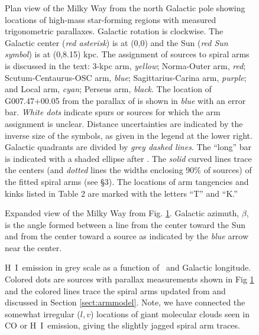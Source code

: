 \documentclass[12pt,preprint]{aastex}
\def\HI   {H~{\small I}}
\def\vlsr  {\ifmmode {v_{\rm LSR}}\else {$v_{\rm LSR}$}\fi}
\begin{document}
\begin{figure}[htp]
\caption{\small
Plan view of the Milky Way from the north Galactic pole showing locations of 
high-mass star-forming regions with measured trigonometric parallaxes.
Galactic rotation is clockwise.  
The Galactic center ({\it red asterisk}) is at (0,0) and the Sun 
({\it red Sun symbol}) is at (0,8.15) kpc.
The assignment of sources to spiral arms is discussed in the text:
3-kpc arm, {\it yellow}; Norma-Outer arm, {\it red};  
Scutum-Centaurus-OSC arm, {\it blue}; Sagittarius-Carina arm, {\it purple}; and 
Local arm, {\it cyan}; Perseus arm, {\it black}.  The location of G007.47+00.05
from the parallax of \citet{Sanna17} is shown in {\it blue} with an error bar.
{\it White dots} indicate spurs or sources for which the arm assignment is unclear.
Distance uncertainties are indicated by the inverse size of the symbols, as
given in the legend at the lower right.
Galactic quadrants are divided by {\it grey dashed lines}.
The ``long'' bar is indicated with a shaded ellipse after \citet{Wegg:15}.
The {\it solid} curved lines trace the centers (and {\it dotted} lines the widths
enclosing 90\% of sources) of the fitted spiral arms (see \S3).  The locations
of arm tangencies and kinks listed in Table 2 are marked with the letters ``T''
and ``K.''
       }
\label{fig:parallaxes}
\end{figure}

\begin{figure}[htp]
\caption{\small
Expanded view of the Milky Way from Fig. \ref{fig:parallaxes}.
Galactic azimuth, $\beta$, is the angle formed between
a line from the center toward the Sun and from the center toward
a source as indicated by the {\it blue} arrow near the center.
       }
\label{fig:zoom}
\end{figure}

\begin{figure}[htp]
\caption{\small
\HI\ emission in grey scale as a function of \vlsr\ and Galactic longitude.
Colored dots are sources with parallax measurements shown in Fig \ref{fig:parallaxes}
and the colored lines trace the spiral arms updated from \citet{Reid:16} and 
discussed in Section \ref{sect:armmodel}.  Note, we have connected the somewhat
irregular ($l,v$) locations of giant molecular clouds seen in CO or \HI\ emission, 
giving the slightly jagged spiral arm traces.  
       }
\label{fig:LV}
\end{figure}
\end{document}

